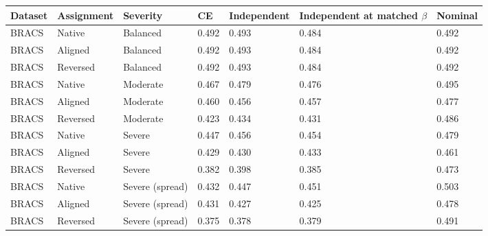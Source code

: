 \begin{tabular}{lllllll}
\toprule
Dataset & Assignment & Severity & CE & Independent & Independent at matched $\beta$ & Nominal \\
\midrule
BRACS & Native & Balanced & 0.492 & 0.493 & 0.484 & 0.492 \\
BRACS & Aligned & Balanced & 0.492 & 0.493 & 0.484 & 0.492 \\
BRACS & Reversed & Balanced & 0.492 & 0.493 & 0.484 & 0.492 \\
BRACS & Native & Moderate & 0.467 & 0.479 & 0.476 & 0.495 \\
BRACS & Aligned & Moderate & 0.460 & 0.456 & 0.457 & 0.477 \\
BRACS & Reversed & Moderate & 0.423 & 0.434 & 0.431 & 0.486 \\
BRACS & Native & Severe & 0.447 & 0.456 & 0.454 & 0.479 \\
BRACS & Aligned & Severe & 0.429 & 0.430 & 0.433 & 0.461 \\
BRACS & Reversed & Severe & 0.382 & 0.398 & 0.385 & 0.473 \\
BRACS & Native & Severe (spread) & 0.432 & 0.447 & 0.451 & 0.503 \\
BRACS & Aligned & Severe (spread) & 0.431 & 0.427 & 0.425 & 0.478 \\
BRACS & Reversed & Severe (spread) & 0.375 & 0.378 & 0.379 & 0.491 \\
\bottomrule
\end{tabular}
